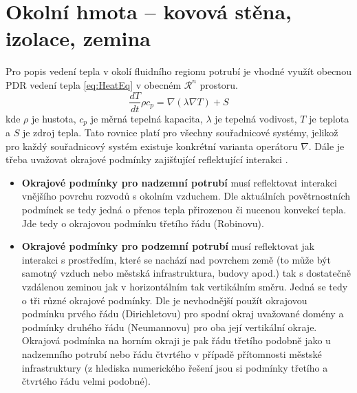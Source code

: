 \section{Okolní hmota – kovová stěna, izolace, zemina}
\label{sec:SurroundingMass}
Pro popis vedení tepla v okolí fluidního regionu potrubí je vhodné využít
obecnou PDR vedení tepla \ref{eq:HeatEq} v obecném \(\mathcal{R}^n\) prostoru.
\begin{equation}
  \label{eq:HeatEq}
  \frac{dT}{dt}\rho{c_p}=\nabla(\lambda\nabla{T})+S
\end{equation}
kde \(\rho\) je hustota, \(c_p\) je měrná tepelná kapacita, \(\lambda\) je
tepelná vodivost, \(T\) je teplota a \(S\) je zdroj tepla. Tato rovnice platí
pro všechny souřadnicové systémy, jelikož pro každý souřadnicový systém
existuje konkrétní varianta operátoru \(\nabla\). Dále je třeba uvažovat
okrajové podmínky zajišťující reflektující interakci .
\begin{itemize}
  \item
    \textbf{Okrajové podmínky pro nadzemní potrubí} musí reflektovat interakci
    vnějšího povrchu rozvodů s okolním vzduchem. Dle aktuálních povětrnostních
    podmínek se tedy jedná o přenos tepla přirozenou či nucenou
    konvekcí tepla. Jde tedy o okrajovou podmínku třetího řádu (Robinovu).
  \item
    \textbf{Okrajové podmínky pro podzemní potrubí} musí reflektovat jak
    interakci s prostředím, které se nachází nad povrchem země (to může být
    samotný vzduch nebo městská infrastruktura, budovy apod.) tak s dostatečně
    vzdálenou zeminou jak v horizontálním tak vertikálním směru. Jedná se tedy
    o tři různé okrajové podmínky. Dle  je nevhodnější použít
    okrajovou podmínku prvého řádu (Dirichletovu) pro spodní okraj uvažované
    domény a podmínky druhého řádu (Neumannovu) pro oba její vertikální okraje.
    Okrajová podmínka na horním okraji je pak řádu třetího podobně jako u
    nadzemního potrubí nebo řádu čtvrtého v případě přítomnosti městské
    infrastruktury (z hlediska numerického řešení jsou si podmínky třetího a
    čtvrtého řádu velmi podobné).
\end{itemize}

